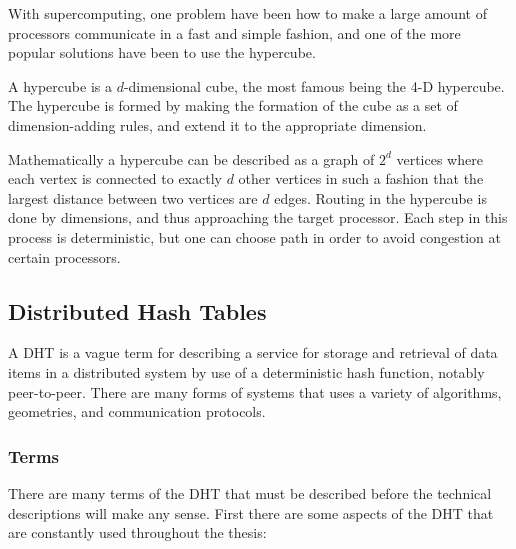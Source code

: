 With supercomputing, one problem have been how to make a large amount of
 processors communicate in a fast and simple fashion, and one of the more
 popular solutions have been to use the hypercube\cite{hayes-86-microprocessor}.

A hypercube is a $d$-dimensional cube, the most famous being the 4-D hypercube.
 The hypercube is formed by making the formation of the cube as a set of
 dimension-adding rules, and extend it to the appropriate dimension.

Mathematically a hypercube can be described as a graph of $2^d$ vertices where
 each vertex is connected to exactly $d$ other vertices in such a fashion that
 the largest distance between two vertices are $d$ edges.
 Routing in the hypercube is done by  dimensions, and thus
 approaching the target processor. Each step in this process is deterministic,
 but one can choose path in order to avoid congestion at certain processors.




\subsection{Distributed Hash Tables}

A DHT is a vague term for describing a service for storage and retrieval of data
 items in a distributed system by use of a deterministic hash function,
 notably peer-to-peer. There are many forms of
 systems that uses a variety of algorithms, geometries, and communication
 protocols.

\subsubsection{Terms}

There are many terms of the DHT that must be described before the technical
 descriptions will make any sense. First there are some aspects of the DHT that
 are constantly used throughout the thesis:

